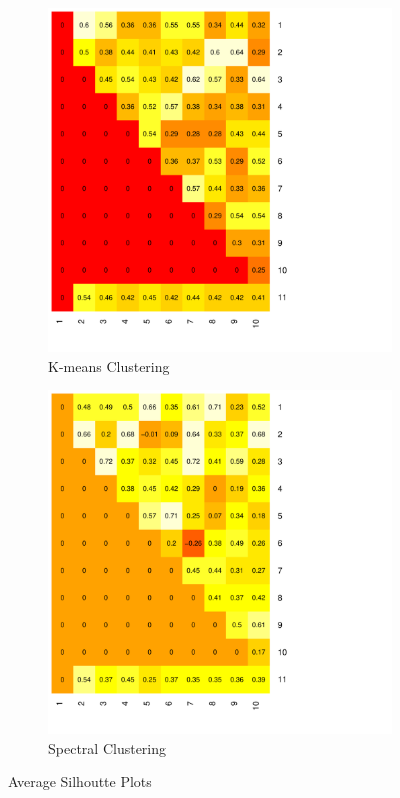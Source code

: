 \documentclass[12pt, leqno]{article}
\begin{document}
\begin{figure}
\centering
\begin{subfigure}{.5\textwidth}
  \centering
  \includegraphics[width=.65\linewidth]{kmeanssil.pdf}
  \caption{K-means Clustering}
  \label{fig:sub3}
\end{subfigure}%
\begin{subfigure}{.5\textwidth}
  \centering
  \includegraphics[width=.65\linewidth]{specsil.pdf}
  \caption{Spectral Clustering}
  \label{fig:sub4}
\end{subfigure}
\caption{Average Silhoutte Plots}
\label{fig1}
\end{figure}

\newpage
\end{document}
